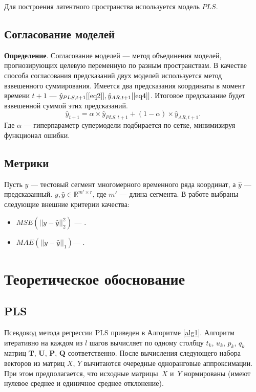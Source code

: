 \documentclass{article}
\begin{document}
Для построения латентного пространства используется модель $PLS$.
\subsection{Согласование моделей}
\textbf{Определение}. Согласование моделей ---  метод объединения моделей, прогнозирующих целевую переменную по разным пространствам.
В качестве способа согласования предсказаний двух моделей используется метод взвешенного суммирования. Имеется два предсказания координаты в момент времени $t+1$ --- $\hat{y}_{PLS, t+1}[\ref{eq2}], \hat{y}_{AR, t+1}[\ref{eq4}]$. Итоговое предсказание будет взвешенной суммой этих предсказаний. \[\hat{y}_{t+1} = \alpha \times \hat{y}_{PLS, t+1} + (1 - \alpha) \times \hat{y}_{AR, t+1}.\] Где $\alpha$ --- гиперпараметр супермодели подбирается по сетке, минимизируя функционал ошибки.
\subsection{Метрики}
Пусть $y$ ---  тестовый сегмент многомерного временного ряда координат, а $\hat{y}$ --- предсказанный.  $y, \hat{y} \in \mathbb{R}^{m' \times r}$, где $m'$ --- длина сегмента. В работе выбраны следующие внешние критерии качества:
\begin{itemize}
    \item $MSE(||y-\hat y||_2^2 )$ --- .
    \item $MAE(||y-\hat y||_1)$--- .
    
\end{itemize}


\section{Теоретическое обоснование}
\subsection{PLS}
Псевдокод метода регрессии PLS приведен в Алгоритме \ref{alg1}.
Алгоритм итеративно на каждом из $l$ шагов вычисляет по одному столбцу $t_k$, $u_k$, $p_k$, $q_k$ матриц $\mathbf{T}$, $\mathbf{U}$, $\mathbf{P}$, $\mathbf{Q}$ соответственно. 
После вычисления следующего набора векторов из матриц $X$, $Y$ вычитаются очередные одноранговые аппроксимации. 
При этом предполагается, что исходные матрицы~$X$ и~$Y$ нормированы (имеют нулевое среднее и единичное среднее отклонение).
\end{document}
